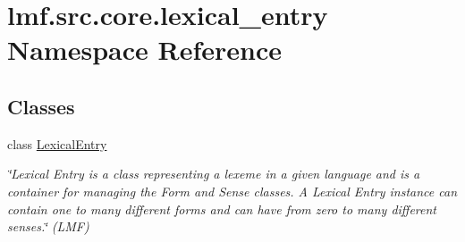 \hypertarget{namespacelmf_1_1src_1_1core_1_1lexical__entry}{\section{lmf.\+src.\+core.\+lexical\+\_\+entry Namespace Reference}
\label{namespacelmf_1_1src_1_1core_1_1lexical__entry}
}
\subsection*{Classes}
\begin{DoxyCompactItemize}
\item 
class \hyperlink{classlmf_1_1src_1_1core_1_1lexical__entry_1_1_lexical_entry}{Lexical\+Entry}
\begin{DoxyCompactList}\small\item\em \char`\"{}\+Lexical Entry is a class representing a lexeme in a given language and is a container for managing the Form and Sense classes. A Lexical Entry instance can contain one to many different forms and can have from zero to many different senses.\char`\"{} (L\+M\+F) \end{DoxyCompactList}\end{DoxyCompactItemize}
